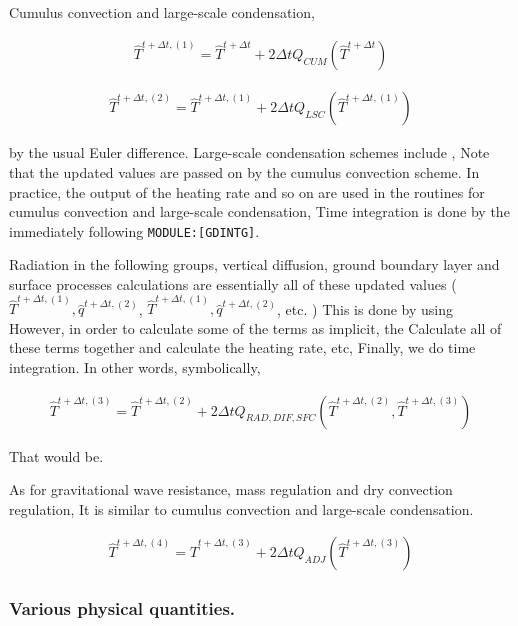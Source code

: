 Cumulus convection and large-scale condensation,

\begin{eqnarray}
  \hat{T}^{t+\Delta t,(1)} = \hat{T}^{t+\Delta t}
                         +  2 \Delta t Q_{CUM}(\hat{T}^{t+\Delta t})
\end{eqnarray}

\begin{eqnarray}
  \hat{T}^{t+\Delta t,(2)} = \hat{T}^{t+\Delta t,(1)}
                         +  2 \Delta t Q_{LSC}(\hat{T}^{t+\Delta t,(1)})
\end{eqnarray}

by the usual Euler difference. Large-scale condensation schemes include
, Note that the updated values are passed on by the cumulus convection
scheme. In practice, the output of the heating rate and so on are used
in the routines for cumulus convection and large-scale condensation,
Time integration is done by the immediately following
\texttt{MODULE:{[}GDINTG{]}}.

Radiation in the following groups, vertical diffusion, ground boundary
layer and surface processes calculations are essentially all of these
updated values ( \(\hat{T}^{t+\Delta t,(1)}, \hat{q}^{t+\Delta t,(2)}\),
\(\hat{T}^{t+\Delta t,(1)}, \hat{q}^{t+\Delta t,(2)}\), etc. ) This is
done by using However, in order to calculate some of the terms as
implicit, the Calculate all of these terms together and calculate the
heating rate, etc, Finally, we do time integration. In other words,
symbolically,

\begin{eqnarray}
  \hat{T}^{t+\Delta t,(3)} = \hat{T}^{t+\Delta t,(2)}
              + 2 \Delta t Q_{RAD,DIF,SFC}
               (\hat{T}^{t+\Delta t,(2)},\hat{T}^{t+\Delta t,(3)})
\end{eqnarray}

That would be.

As for gravitational wave resistance, mass regulation and dry convection
regulation, It is similar to cumulus convection and large-scale
condensation.

\begin{eqnarray}
  \hat{T}^{t+\Delta t,(4)} = \hat{T}^{t+\Delta t,(3)}
              +  2 \Delta t Q_{ADJ}(\hat{T}^{t+\Delta t,(3)})
\end{eqnarray}

\hypertarget{various-physical-quantities.}{%
\subsubsection{Various physical
quantities.}\label{various-physical-quantities.}}

